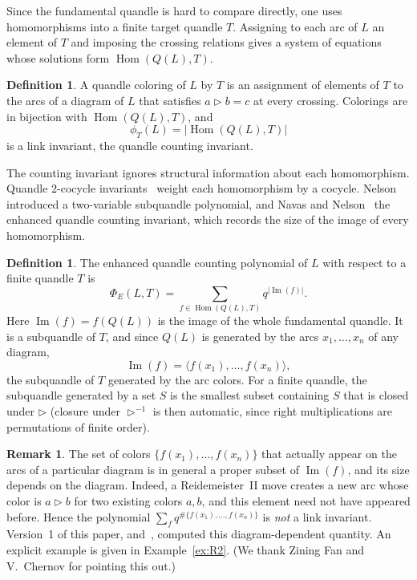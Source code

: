 \documentclass[11pt]{article}
\theoremstyle{definition}
\newtheorem{definition}[theorem]{Definition}
\newtheorem{remark}[theorem]{Remark}
\newcommand{\Hom}{\operatorname{Hom}}
\renewcommand{\Im}{\operatorname{Im}}
\newcommand{\tr}{\triangleright}
\newcommand{\tri}{\triangleright^{-1}}
\newcommand{\PhiE}{\Phi_E}
\newcommand{\gen}[1]{\langle #1 \rangle}
\begin{document}
Since the fundamental quandle is hard to compare directly, one uses homomorphisms into a finite
target quandle $T$. Assigning to each arc of $L$ an element of $T$ and imposing the crossing
relations gives a system of equations whose solutions form $\Hom(Q(L),T)$.

\begin{definition}
A quandle coloring of $L$ by $T$ is an assignment of elements of $T$ to the arcs of a diagram of $L$
that satisfies $a\tr b=c$ at every crossing. Colorings are in bijection with $\Hom(Q(L),T)$, and
\[
\phi_T(L)=|\Hom(Q(L),T)|
\]
is a link invariant, the quandle counting invariant.
\end{definition}

The counting invariant ignores structural information about each homomorphism. Quandle
$2$-cocycle invariants~\cite{CEGS05} weight each homomorphism by a cocycle. Nelson~\cite{Nel08}
introduced a two-variable subquandle polynomial, and Navas and Nelson~\cite{NN08} the enhanced quandle
counting invariant, which records the size of the image of every homomorphism.

\begin{definition}\label{def:enhanced}
The enhanced quandle counting polynomial of $L$ with respect to a finite quandle $T$ is
\[
\PhiE(L,T)=\sum_{f\in\Hom(Q(L),T)}q^{|\Im(f)|}.
\]
Here $\Im(f)=f(Q(L))$ is the image of the whole fundamental quandle. It is a subquandle of $T$, and
since $Q(L)$ is generated by the arcs $x_1,\dots,x_n$ of any diagram,
\[
\Im(f)=\gen{f(x_1),\dots,f(x_n)},
\]
the subquandle of $T$ generated by the arc colors. For a finite quandle, the subquandle generated by
a set $S$ is the smallest subset containing $S$ that is closed under $\tr$ (closure under $\tri$ is
then automatic, since right multiplications are permutations of finite order).
\end{definition}

\begin{remark}\label{rem:error}
The set of colors $\{f(x_1),\dots,f(x_n)\}$ that actually appear on the arcs of a particular diagram
is in general a proper subset of $\Im(f)$, and its size depends on the diagram. Indeed, a
Reidemeister~II move creates a new arc whose color is $a\tr b$ for two existing colors $a,b$, and this
element need not have appeared before. Hence the polynomial $\sum_f q^{\#\{f(x_1),\dots,f(x_n)\}}$ is
\emph{not} a link invariant. Version~1 of this paper, and~\cite{Jai24}, computed this diagram-dependent
quantity. An explicit example is given in Example~\ref{ex:R2}. (We thank Zining Fan and
V.~Chernov for pointing this out.)
\end{remark}
\end{document}

